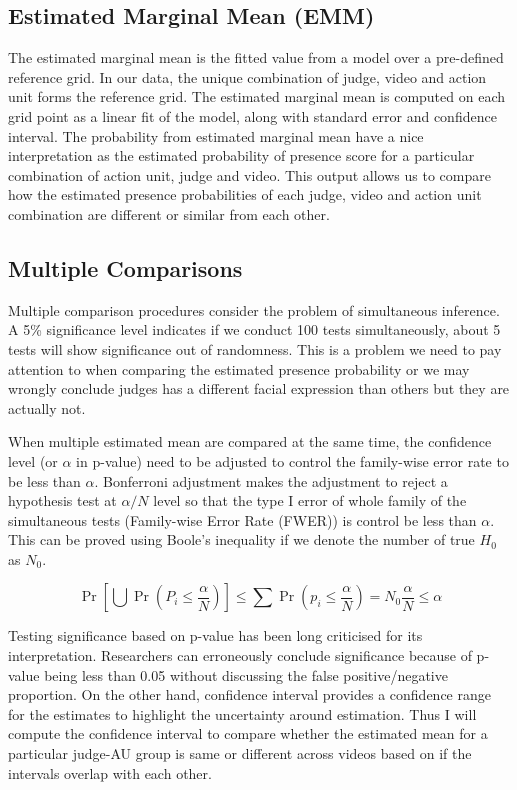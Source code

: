 \documentclass{monashthesis}
\begin{document}
\hypertarget{estimated-marginal-mean-emm}{%
\subsection{Estimated Marginal Mean (EMM)}\label{estimated-marginal-mean-emm}}

The estimated marginal mean \autocite{gelman2006data} is the fitted value from a model over a pre-defined reference grid. In our data, the unique combination of judge, video and action unit forms the reference grid. The estimated marginal mean is computed on each grid point as a linear fit of the model, along with standard error and confidence interval. The probability from estimated marginal mean have a nice interpretation as the estimated probability of presence score for a particular combination of action unit, judge and video. This output allows us to compare how the estimated presence probabilities of each judge, video and action unit combination are different or similar from each other.

\hypertarget{multiple-comparisons}{%
\subsection{Multiple Comparisons}\label{multiple-comparisons}}

Multiple comparison procedures consider the problem of simultaneous inference. A 5\% significance level indicates if we conduct 100 tests simultaneously, about 5 tests will show significance out of randomness. This is a problem we need to pay attention to when comparing the estimated presence probability or we may wrongly conclude judges has a different facial expression than others but they are actually not.

When multiple estimated mean are compared at the same time, the confidence level (or \(\alpha\) in p-value) need to be adjusted to control the family-wise error rate to be less than \(\alpha\). Bonferroni adjustment makes the adjustment to reject a hypothesis test at \(\alpha/N\) level so that the type I error of whole family of the simultaneous tests (Family-wise Error Rate (FWER)) is control be less than \(\alpha\). This can be proved using Boole's inequality if we denote the number of true \(H_0\) as \(N_0\).

\[\Pr\left[\bigcup \Pr(P_i \le\frac{\alpha}{N})\right] \le \sum \Pr\left(p_i \le \frac{\alpha}{N}\right) = N_0\frac{\alpha}{N} \le \alpha\]

Testing significance based on p-value has been long criticised for its interpretation. Researchers can erroneously conclude significance because of p-value being less than 0.05 without discussing the false positive/negative proportion. On the other hand, confidence interval provides a confidence range for the estimates to highlight the uncertainty around estimation. Thus I will compute the confidence interval to compare whether the estimated mean for a particular judge-AU group is same or different across videos based on if the intervals overlap with each other.
\end{document}
